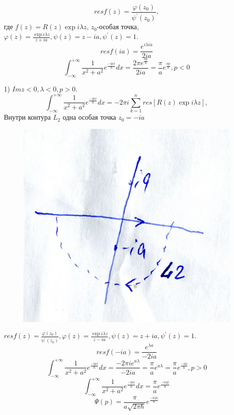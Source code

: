 $$res f(z) = \frac{\varphi(z_0)}{\psi^{'}(z_0)},$$
где $f(z)=R(z)\exp{i \lambda z}$, $z_0$-особая точка, $\varphi(z)=\frac{\exp{i \lambda z}}{z+ia}, \psi(z)=z-ia, \psi^{'}(z)=1$.
$$res f(ia) = \frac{e^{i \lambda i a}}{2ia}$$
$$\int_{-\infty}^{+\infty} \frac{1}{x^2+a^2} e^{\frac{-ipx}{\hbar}}dx=\frac{2\pi e^{\frac{ap}{\hbar}}}{2ia}=\frac{\pi}{a} e^{\frac{ap}{\hbar}}, p<0$$

1) $Im z<0, \lambda <0, p>0$.
$$\int_{-\infty}^{+\infty} \frac{1}{x^2+a^2} e^{\frac{-ipx}{\hbar}}dx=-2\pi i \sum_{k=1}^n res [R(z)\exp{i \lambda z}],$$
Внутри контура $L_2$ одна особая точка $z_0=-ia$

\begin{figure}
\includegraphics[width=\linewidth]{fig/fig831}
\caption{}
\vspace{-17pt}
\end{figure}

$res f(z) = \frac{\varphi(z_0)}{\psi^{'}(z_0)}, \varphi(z)=\frac{\exp{i \lambda z}}{z-ia}, \psi(z)=z+ia, \psi^{'}(z)=1$.
$$res f(-ia) = \frac{e^{\lambda a}}{-2ia}$$
$$\int_{-\infty}^{+\infty} \frac{1}{x^2+a^2} e^{\frac{-ipx}{\hbar}}dx=\frac{-2\pi i e^{a\lambda}}{-2ia}=\frac{\pi}{a} e^{a\lambda}=\frac{\pi}{a} e^{\frac{-ap}{\hbar}}, p>0$$
$$\int_{-\infty}^{+\infty} \frac{1}{x^2+a^2} e^{\frac{-ipx}{\hbar}}dx=\frac{\pi}{a} e^{\frac{-a|p|}{\hbar}}$$
$$\Psi(p)=\frac{\pi}{a\sqrt{2\pi \hbar}}e^{\frac{-a|p|}{\hbar}}$$

